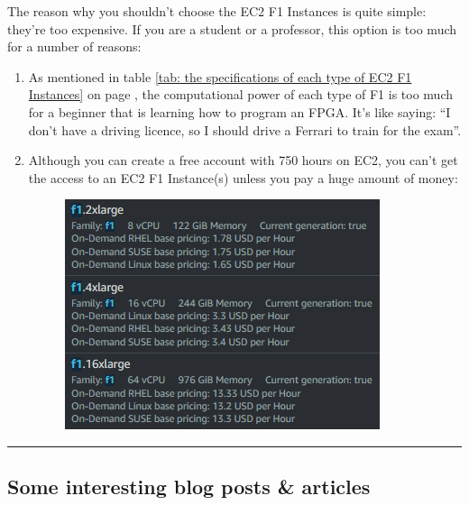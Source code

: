\documentclass[a4paper]{article}
\newcommand{\dquotes}[1]{``#1''}
\newcommand{\longline}{\noindent\rule{\textwidth}{0.4pt}}
\begin{document}
    The reason why you shouldn't choose the EC2 F1 Instances is quite simple: they're too expensive. If you are a student or a professor, this option is too much for a number of reasons:
    \begin{enumerate}
        \item As mentioned in table \ref{tab: the specifications of each type of EC2 F1 Instances} on page \pageref{tab: the specifications of each type of EC2 F1 Instances}, the computational power of each type of F1 is too much for a beginner that is learning how to program an FPGA. It's like saying: \dquotes{I don't have a driving licence, so I should drive a Ferrari to train for the exam}.

        \item Although you can create a free account with 750 hours on EC2, you can't get the access to an EC2 F1 Instance(s) unless you pay a huge amount of money:
        \begin{figure}[!htp]
            \centering
            \includegraphics[width=.6\textwidth]{img/f1_costs.png}
        \end{figure}
    \end{enumerate}

    \longline

    \subsection{Some interesting blog posts \& articles}
\end{document}
